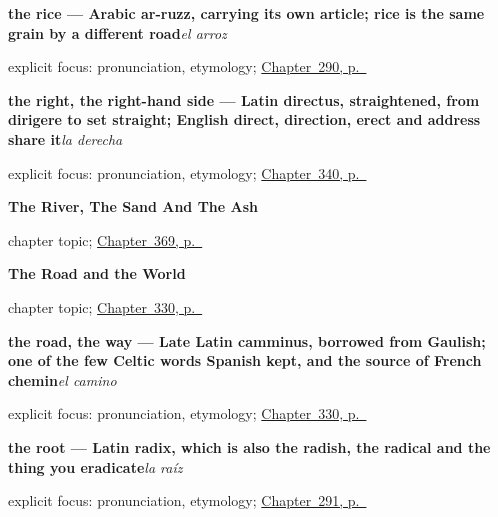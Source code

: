 \noindent\begin{minipage}[t]{\linewidth}
\raggedright
\textbf{the rice — Arabic ar-ruzz, carrying its own article; rice is the same grain by a different road}\enspace\emph{el arroz}\par
\footnotesize explicit focus: pronunciation, etymology; \hyperref[ch:lo-que-se-come]{Chapter~290, p.~\pageref*{ch:lo-que-se-come}}
\end{minipage}\par\smallskip

\noindent\begin{minipage}[t]{\linewidth}
\raggedright
\textbf{the right, the right-hand side — Latin directus, straightened, from dirigere to set straight; English direct, direction, erect and address share it}\enspace\emph{la derecha}\par
\footnotesize explicit focus: pronunciation, etymology; \hyperref[ch:cerca-y-lejos]{Chapter~340, p.~\pageref*{ch:cerca-y-lejos}}
\end{minipage}\par\smallskip

\noindent\begin{minipage}[t]{\linewidth}
\raggedright
\textbf{The River, The Sand And The Ash}\par
\footnotesize chapter topic; \hyperref[ch:el-rio-y-la-arena]{Chapter~369, p.~\pageref*{ch:el-rio-y-la-arena}}
\end{minipage}\par\smallskip

\noindent\begin{minipage}[t]{\linewidth}
\raggedright
\textbf{The Road and the World}\par
\footnotesize chapter topic; \hyperref[ch:camino-y-vez]{Chapter~330, p.~\pageref*{ch:camino-y-vez}}
\end{minipage}\par\smallskip

\noindent\begin{minipage}[t]{\linewidth}
\raggedright
\textbf{the road, the way — Late Latin camminus, borrowed from Gaulish; one of the few Celtic words Spanish kept, and the source of French chemin}\enspace\emph{el camino}\par
\footnotesize explicit focus: pronunciation, etymology; \hyperref[ch:camino-y-vez]{Chapter~330, p.~\pageref*{ch:camino-y-vez}}
\end{minipage}\par\smallskip

\noindent\begin{minipage}[t]{\linewidth}
\raggedright
\textbf{the root — Latin radix, which is also the radish, the radical and the thing you eradicate}\enspace\emph{la raíz}\par
\footnotesize explicit focus: pronunciation, etymology; \hyperref[ch:de-la-semilla]{Chapter~291, p.~\pageref*{ch:de-la-semilla}}
\end{minipage}\par\smallskip

